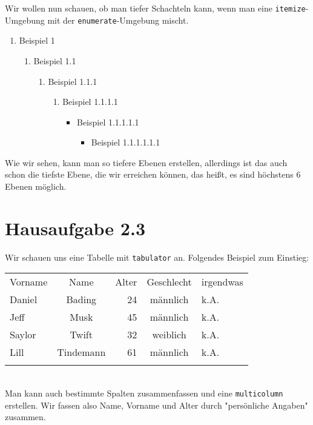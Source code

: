 \documentclass{article}
\begin{document}
Wir wollen nun schauen, ob man tiefer Schachteln kann, wenn man eine \texttt{itemize}-Umgebung mit der \texttt{enumerate}-Umgebung mischt. 
\begin{enumerate}
\item Beispiel 1

\begin{enumerate}
\item Beispiel 1.1

\begin{enumerate}
\item Beispiel 1.1.1

\begin{enumerate}
\item Beispiel 1.1.1.1

\begin{itemize}
\item Beispiel 1.1.1.1.1

\begin{itemize}
\item Beispiel 1.1.1.1.1.1

\end{itemize}

\end{itemize}

\end{enumerate}

\end{enumerate}

\end{enumerate}

\end{enumerate}
Wie wir sehen, kann man so tiefere Ebenen erstellen, allerdings ist das auch schon die tiefste Ebene, die wir erreichen können, das heißt, es sind höchstens 6 Ebenen möglich. 

\newpage

\section{Hausaufgabe 2.3}

Wir schauen uns eine Tabelle mit \texttt{tabulator} an. Folgendes Beispiel zum Einstieg: \\

\begin{tabular}{l c r c l}
Vorname & Name & Alter & Geschlecht & irgendwas \\
Daniel & Bading & 24 & männlich & k.A. \\
Jeff & Musk & 45 & männlich & k.A. \\
Saylor & Twift & 32 & weiblich & k.A. \\
Lill & Tindemann & 61 & männlich & k.A. \\
\\
\end{tabular}\\
Man kann auch bestimmte Spalten zusammenfassen und eine \texttt{multicolumn} erstellen. Wir fassen also Name, Vorname und Alter durch "persönliche Angaben" zusammen.\\
\end{document}
